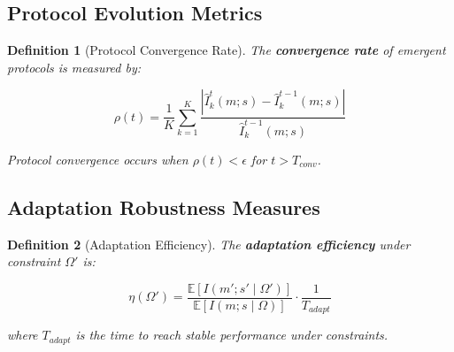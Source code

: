 \documentclass{article}
\newtheorem{definition}{Definition}
\begin{document}
\subsection{Protocol Evolution Metrics}

\begin{definition}[Protocol Convergence Rate]
The \textbf{convergence rate} of emergent protocols is measured by:

\[
\rho(t) = \frac{1}{K} \sum_{k=1}^K \frac{|\hat{I}_k^t(m; s) - \hat{I}_k^{t-1}(m; s)|}{\hat{I}_k^{t-1}(m; s)}
\]

Protocol convergence occurs when $\rho(t) < \epsilon$ for $t > T_{conv}$.
\end{definition}

\subsection{Adaptation Robustness Measures}

\begin{definition}[Adaptation Efficiency]
The \textbf{adaptation efficiency} under constraint $\Omega'$ is:

\[
\eta(\Omega') = \frac{\mathbb{E}[I(m'; s' \mid \Omega')]}{\mathbb{E}[I(m; s \mid \Omega)]} \cdot \frac{1}{T_{adapt}}
\]

where $T_{adapt}$ is the time to reach stable performance under constraints.
\end{definition}
\end{document}
